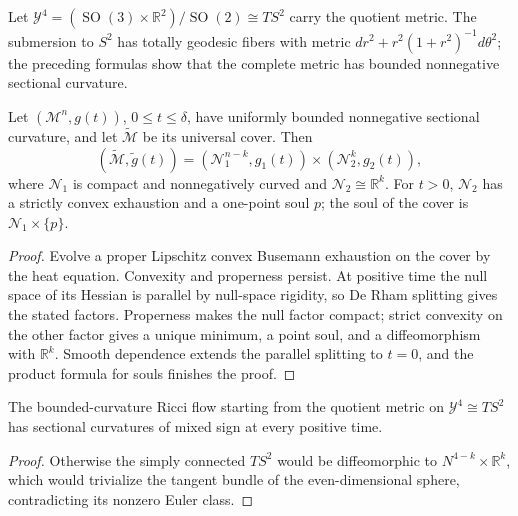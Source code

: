 Let
\(\mathcal Y^4=(\operatorname{SO}(3)\times\mathbb R^2)/\operatorname{SO}(2)
\cong TS^2\) carry the quotient metric.  The submersion to \(S^2\) has
totally geodesic fibers with metric
\(dr^2+r^2(1+r^2)^{-1}d\theta^2\); the preceding formulas show that the
complete metric has bounded nonnegative sectional curvature.

\begin{theorem}
\label{thm:chow-ii-persistent-nonnegative-sectional-splitting}
Let \((\mathcal M^n,g(t))\), \(0\leq t\leq\delta\), have uniformly bounded
nonnegative sectional curvature, and let \(\widetilde{\mathcal M}\) be its
universal cover.  Then
\[
 (\widetilde{\mathcal M},\widetilde g(t))
 =(\mathcal N_1^{n-k},g_1(t))\times(\mathcal N_2^k,g_2(t)),
\]
where \(\mathcal N_1\) is compact and nonnegatively curved and
\(\mathcal N_2\cong\mathbb R^k\).  For \(t>0\), \(\mathcal N_2\) has a
strictly convex exhaustion and a one-point soul \(p\); the soul of the cover
is \(\mathcal N_1\times\{p\}\).
\end{theorem}
\begin{proof}
\sketch
{}
Evolve a proper Lipschitz convex Busemann exhaustion on the cover by the heat
equation.  Convexity and properness persist.  At positive time the null space
of its Hessian is parallel by null-space rigidity, so De Rham splitting gives
the stated factors.  Properness makes the null factor compact; strict
convexity on the other factor gives a unique minimum, a point soul, and a
diffeomorphism with \(\mathbb R^k\).  Smooth dependence extends the parallel
splitting to \(t=0\), and the product formula for souls finishes the proof.
\end{proof}

\begin{corollary}
\label{cor:chow-ii-sectionally-nonnegative-quotient-counterexample}
The bounded-curvature Ricci flow starting from the quotient metric on
\(\mathcal Y^4\cong TS^2\) has sectional curvatures of mixed sign at every
positive time.
\end{corollary}
\begin{proof}
\sketch
{}
Otherwise the simply connected \(TS^2\) would be diffeomorphic to
\(N^{4-k}\times\mathbb R^k\), which would trivialize the tangent bundle of
the even-dimensional sphere, contradicting its nonzero Euler class.
\end{proof}

